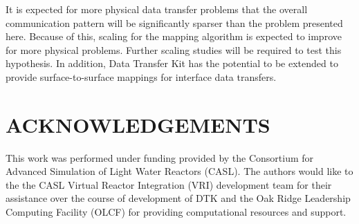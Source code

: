 \documentclass{mc2013}
\begin{document}
It is expected for more physical data transfer problems that the
overall communication pattern will be significantly sparser than the
problem presented here. Because of this, scaling for the mapping
algorithm is expected to improve for more physical problems. Further
scaling studies will be required to test this hypothesis. In addition,
Data Transfer Kit has the potential to be extended to provide
surface-to-surface mappings for interface data transfers.


\section*{ACKNOWLEDGEMENTS}

This work was performed under funding provided by the Consortium for
Advanced Simulation of Light Water Reactors (CASL). The authors would
like to the the CASL Virtual Reactor Integration (VRI) development
team for their assistance over the course of development of DTK and
the Oak Ridge Leadership Computing Facility (OLCF) for providing
computational resources and support.

\setlength{\baselineskip}{12pt}


\end{document}
